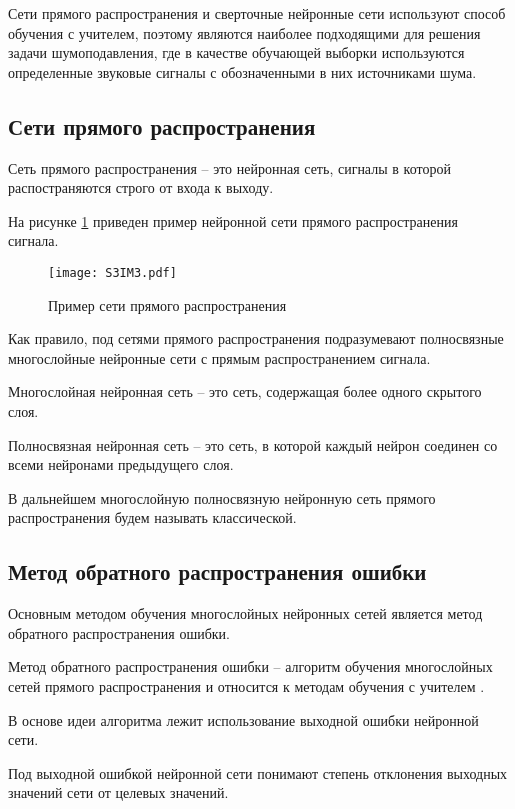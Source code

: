 Сети прямого распространения и сверточные нейронные сети используют способ
обучения с учителем, поэтому являются наиболее подходящими для решения
задачи шумоподавления, где в качестве
обучающей выборки используются определенные звуковые сигналы
с обозначенными в них источниками шума.

\subsection{Сети прямого распространения}

Сеть прямого распространения -- это нейронная сеть, сигналы в которой распостраняются
строго от входа к выходу.

На рисунке \ref{fig:section3:feed_forward} приведен пример нейронной сети
прямого распространения сигнала.

\begin{figure}[h!]
    \centering
    \texttt{[image: S3IM3.pdf]}
    \caption{Пример сети прямого распространения}
    \label{fig:section3:feed_forward}
\end{figure}

Как правило, под сетями прямого распространения подразумевают
полносвязные многослойные нейронные сети с прямым распространением сигнала.

Многослойная нейронная сеть -- это сеть, содержащая более одного скрытого слоя.

Полносвязная нейронная сеть -- это сеть, в которой каждый нейрон соединен со всеми
нейронами предыдущего слоя.

В дальнейшем многослойную полносвязную нейронную сеть прямого распространения
будем называть классической.

\subsection{Метод обратного распространения ошибки}

Основным методом обучения многослойных нейронных сетей является
метод обратного распространения ошибки.

Метод обратного распространения ошибки -- алгоритм обучения 
многослойных сетей прямого распространения и относится 
к методам обучения с учителем \cite{galushkin}.

В основе идеи алгоритма лежит использование выходной ошибки нейронной сети.

Под выходной ошибкой нейронной сети понимают степень отклонения выходных значений
сети от целевых значений.

